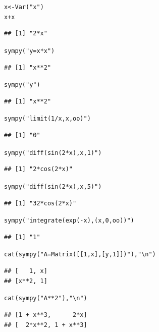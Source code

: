 \documentclass[a4paper]{ctexart}\usepackage[]{graphicx}\usepackage[]{color}
\makeatletter
\newcommand{\hlstr}[1]{\textcolor[rgb]{1,0.4,0.2}{#1}}%
\newcommand{\hlopt}[1]{\textcolor[rgb]{0.251,0.251,0.251}{#1}}%
\newcommand{\hlstd}[1]{\textcolor[rgb]{0.251,0.251,0.251}{#1}}%
\newcommand{\hlkwb}[1]{\textcolor[rgb]{0,0.439,0.902}{#1}}%
\newcommand{\hlkwd}[1]{\textcolor[rgb]{0.69,0.188,0.941}{#1}}%
\newenvironment{kframe}{%
 \def\at@end@of@kframe{}%
 \ifinner\ifhmode%
  \def\at@end@of@kframe{\end{minipage}}%
  \begin{minipage}{\columnwidth}%
 \fi\fi%
 \def\FrameCommand##1{\hskip\@totalleftmargin \hskip-\fboxsep
 \colorbox{shadecolor}{##1}\hskip-\fboxsep
     \hskip-\linewidth \hskip-\@totalleftmargin \hskip\columnwidth}%
 \MakeFramed {\advance\hsize-\width
   \@totalleftmargin\z@ \linewidth\hsize
   \@setminipage}}%
 {\par\unskip\endMakeFramed%
 \at@end@of@kframe}
\newenvironment{knitrout}{}{} %
\makeatother
\begin{document}
\begin{knitrout}
\begin{kframe}
{\ttfamily\noindent\itshape\color{messagecolor}{\#\# The following objects are masked from 'package:Ryacas':\\\#\# \\\#\#\ \ \ \  as.character.Sym, deriv.Sym, Integrate, Limit, List, Math.Sym,\\\#\#\ \ \ \  Ops.Sym, print.Sym, Sym}}\begin{alltt}
\hlstd{x} \hlkwb{<-} \hlkwd{Var}\hlstd{(}\hlstr{"x"}\hlstd{)}
\hlstd{x}\hlopt{+}\hlstd{x}
\end{alltt}
\begin{verbatim}
## [1] "2*x"
\end{verbatim}
\begin{alltt}
\hlkwd{sympy}\hlstd{(}\hlstr{"y = x*x"}\hlstd{)}
\end{alltt}
\begin{verbatim}
## [1] "x**2"
\end{verbatim}
\begin{alltt}
\hlkwd{sympy}\hlstd{(}\hlstr{"y"}\hlstd{)}
\end{alltt}
\begin{verbatim}
## [1] "x**2"
\end{verbatim}
\begin{alltt}
\hlkwd{sympy}\hlstd{(}\hlstr{"limit(1/x, x, oo)"}\hlstd{)}
\end{alltt}
\begin{verbatim}
## [1] "0"
\end{verbatim}
\begin{alltt}
\hlkwd{sympy}\hlstd{(}\hlstr{"diff(sin(2*x), x, 1)"}\hlstd{)}
\end{alltt}
\begin{verbatim}
## [1] "2*cos(2*x)"
\end{verbatim}
\begin{alltt}
\hlkwd{sympy}\hlstd{(}\hlstr{"diff(sin(2*x), x, 5)"}\hlstd{)}
\end{alltt}
\begin{verbatim}
## [1] "32*cos(2*x)"
\end{verbatim}
\begin{alltt}
\hlkwd{sympy}\hlstd{(}\hlstr{"integrate(exp(-x), (x, 0, oo))"}\hlstd{)}
\end{alltt}
\begin{verbatim}
## [1] "1"
\end{verbatim}
\begin{alltt}
\hlkwd{cat}\hlstd{(}\hlkwd{sympy}\hlstd{(}\hlstr{"A = Matrix([[1,x], [y,1]])"}\hlstd{),} \hlstr{"\textbackslash{}n"}\hlstd{)}
\end{alltt}
\begin{verbatim}
## [   1, x]
## [x**2, 1]
\end{verbatim}
\begin{alltt}
\hlkwd{cat}\hlstd{(}\hlkwd{sympy}\hlstd{(}\hlstr{"A**2"}\hlstd{),} \hlstr{"\textbackslash{}n"}\hlstd{)}
\end{alltt}
\begin{verbatim}
## [1 + x**3,      2*x]
## [  2*x**2, 1 + x**3]
\end{verbatim}
\end{kframe}
\end{knitrout}
\end{document}
